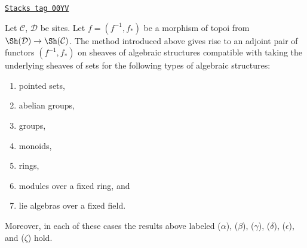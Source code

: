 \begin{proposition}
\label{sites-proposition-functoriality-algebraic-structures-topoi}
\href{https://stacks.math.columbia.edu/tag/00YV}{\texttt{Stacks tag 00YV}}


Let $\mathcal{C}$, $\mathcal{D}$ be sites.
Let $f = (f^{-1}, f_*)$ be a morphism of topoi
from $\Sh(\mathcal{D}) \to \Sh(\mathcal{C})$.
The method introduced above gives rise to an adjoint
pair of functors $(f^{-1}, f_*)$ on sheaves of algebraic structures
compatible with taking the underlying sheaves of sets
for the following types of algebraic structures:
\begin{enumerate}
\item pointed sets,
\item abelian groups,
\item groups,
\item monoids,
\item rings,
\item modules over a fixed ring, and
\item lie algebras over a fixed field.
\end{enumerate}
Moreover, in each of these cases the results above labeled ($\alpha$),
($\beta$), ($\gamma$), ($\delta$), ($\epsilon$), and ($\zeta$) hold.
\end{proposition}

